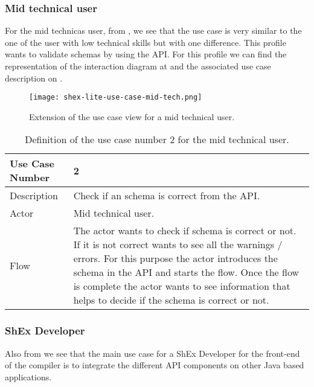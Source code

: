 \subsubsection{Mid technical user}
For the mid technicas user, from , we see that the use case is very similar to the
one of the user with low technical skills but with one difference. This profile wants to validate schemas by using
the API. For this profile we can find the representation of the interaction diagram at 
and the associated use case description on .

\begin{figure}[hb]
    \texttt{[image: shex-lite-use-case-mid-tech.png]}
    \caption[Extension of the use case view for a mid technical user]{Extension of the use case view for a 
    mid technical user.}
\end{figure}

\begin{table}[h!]
    \begin{tabular}{ | m{2cm} | m{8cm}| }
        \hline
        Use Case Number & 2 \\
        \hline
        Description & Check if an schema is correct from the API. \\
        \hline
        Actor & Mid technical user. \\
        \hline
        Flow & The actor wants to check if schema is correct or not. If it is not correct wants to see all 
        the warnings / errors. For this purpose the actor introduces the schema in the API and starts 
        the flow. Once the flow is complete the actor wants to see information that helps to decide if the 
        schema is correct or not. \\
        \hline
    \end{tabular}
    \caption[Definition of the use case number 2 for the mid technical user]{Definition of the use case 
    number 2 for the mid technical user.}
\end{table}

\subsubsection{ShEx Developer}
Also from  we see that the main use case for a ShEx Developer for the front-end
of the compiler is to integrate the different API components on other Java based applications. 

